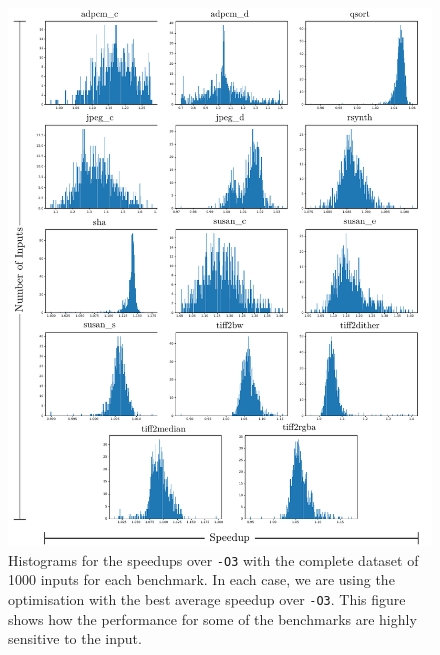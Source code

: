 \begin{figure}[h!]
    \centering
    \includegraphics[width=\textwidth]{figs/speedups-per-input.pdf}
    \caption{Histograms for the speedups over \texttt{-O3} with the complete dataset of 1000 inputs for each benchmark.
             In each case, we are using the optimisation with the best average speedup over \texttt{-O3}.
             This figure shows how the performance for some of the benchmarks are highly sensitive to the input.}
    \label{fig:speedups-per-input}
\end{figure}



